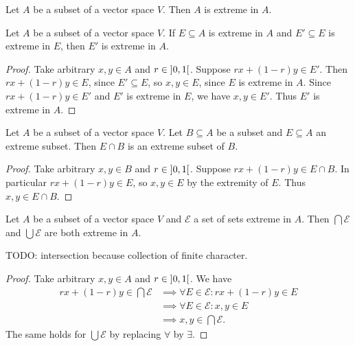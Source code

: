 \begin{lemma} \label{setExtremeInItself}
Let $A$ be a subset of a vector space $V$. Then $A$ is extreme in $A$.
\end{lemma}

\begin{lemma} \label{extremeSetOfExtremeSetIsExtreme}
Let $A$ be a subset of a vector space $V$. If $E\subseteq A$ is extreme in $A$ and $E'\subseteq E$ is extreme in $E$, then $E'$ is extreme in $A$.
\end{lemma}
\begin{proof}
Take arbitrary $x,y\in A$ and $r\in \interval[o]{0,1}$. Suppose $rx+(1-r)y\in E'$. Then $rx+(1-r)y\in E$, since $E'\subseteq E$, so $x,y\in E$, since $E$ is extreme in $A$. Since $rx+(1-r)y\in E'$ and $E'$ is extreme in $E$, we have $x,y\in E'$. Thus $E'$ is extreme in $A$.
\end{proof}

\begin{lemma} \label{extremeSetOfSubset}
Let $A$ be a subset of a vector space $V$. Let $B\subseteq A$ be a subset and $E\subseteq A$ an extreme subset. Then $E\cap B$ is an extreme subset of $B$.
\end{lemma}
\begin{proof}
Take arbitrary $x,y\in B$ and $r\in \interval[o]{0,1}$. Suppose $rx+(1-r)y\in E\cap B$. In particular $rx+(1-r)y\in E$, so $x,y\in E$ by the extremity of $E$. Thus $x,y\in E\cap B$.
\end{proof}

\begin{lemma} \label{extremeSetsClosedUnderUnionIntersection}
Let $A$ be a subset of a vector space $V$ and $\mathcal{E}$ a set of sets extreme in $A$. Then $\bigcap\mathcal{E}$ and $\bigcup\mathcal{E}$ are both extreme in $A$.
\end{lemma}
TODO: intersection because collection of finite character.
\begin{proof}
Take arbitrary $x,y\in A$ and $r\in \interval[o]{0,1}$. We have
\begin{align*}
rx+ (1-r)y\in \bigcap\mathcal{E} &\implies \forall E\in \mathcal{E}: rx+(1-r)y\in E \\
&\implies \forall E\in \mathcal{E}: x,y\in E \\
&\implies x,y\in \bigcap\mathcal{E}.
\end{align*}
The same holds for $\bigcup \mathcal{E}$ by replacing $\forall$ by $\exists$.
\end{proof}

